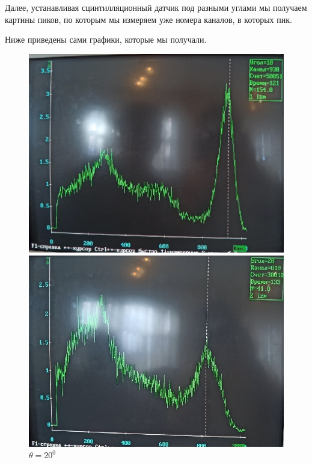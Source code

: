 \documentclass[a4paper, 12pt]{article}%
\begin{document}
Далее, устанавливая сцинтилляционный датчик под разными углами мы получаем картины пиков, по которым мы измеряем уже номера каналов, в которых пик.

Ниже приведены сами графики, которые мы получали.

\begin{figure}[h]
\begin{minipage}[h]{0.3\linewidth}
\includegraphics[width = 1\linewidth]{4.jpg}
\caption{$\theta = 10^0$}
\end{minipage}
\hfill
\begin{minipage}[h]{0.3\linewidth}
\includegraphics[width = 1\linewidth]{5.jpg}
\caption{$\theta = 20^0$}
\end{minipage}

\end{figure}
\end{document}
